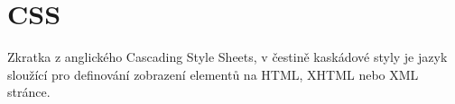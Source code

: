 \documentclass[main.tex]{subfiles}
\begin{document}
\section{CSS}
Zkratka z anglického Cascading Style Sheets, v čestině kaskádové styly je jazyk sloužící pro definování zobrazení elementů na HTML, XHTML nebo XML stránce.
\end{document}
